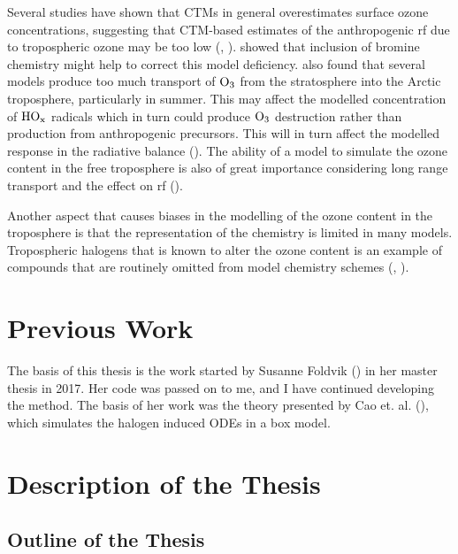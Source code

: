 \medskip

Several studies have shown that CTMs in general overestimates surface ozone concentrations, suggesting that CTM-based estimates of the anthropogenic \acrshort{rf} due to tropospheric ozone may be too low (\cite{WangJacob1998}, \cite{shindell2003}). \cite{Parella} showed that inclusion of bromine chemistry might help to correct this model deficiency. \cite{AMAP2015} also found that several models produce too much transport of $\mathrm{O_3}$ from the stratosphere into the Arctic troposphere, particularly in summer. This may affect the modelled concentration of $\mathrm{HO_x}$ radicals which in turn could produce $\mathrm{O_3}$ destruction rather than production from anthropogenic precursors. This will in turn affect the modelled response in the radiative balance (\cite{AMAP2015}). The ability of a model to simulate the ozone content in the free troposphere is also of great importance considering long range transport and the effect on \acrshort{rf} (\cite{Young2018}).

\medskip

Another aspect that causes biases in the modelling of the ozone content in the troposphere is that the representation of the chemistry is limited in many models. Tropospheric halogens that is known to alter the ozone content is an example of compounds that are routinely omitted from model chemistry schemes (\cite{Young2018}, \cite{Sherwen2017}). 

\section{Previous Work}

The basis of this thesis is the work started by Susanne Foldvik (\cite{Susanne}) in her master thesis in 2017. Her code was passed on to me, and I have continued developing the method. The basis of her work was the theory presented by Cao et. al. (\cite{CAO}), which simulates the halogen induced ODEs in a box model.  


\section{Description of the Thesis}

\subsection{Outline of the Thesis}

